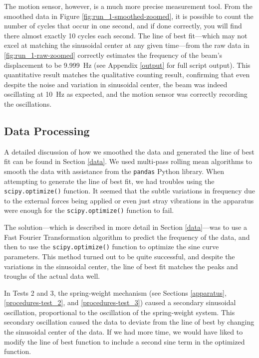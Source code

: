 \documentclass[12 pt]{report}
\begin{document}
The motion sensor, however, is a much more precise measurement tool. From the smoothed data in Figure \ref{fig:run_1-smoothed-zoomed}, it is possible to count the number of cycles that occur in one second, and if done correctly, you will find there almost exactly \num{10} cycles each second. The line of best fit---which may not excel at matching the sinusoidal center at any given time---from the raw data in \ref{fig:run_1-raw-zoomed} correctly estimates the frequency of the beam's displacement to be \qty{9.999}{\hertz} (see Appendix \ref{output} for full script output). This quantitative result matches the qualitative counting result, confirming that even despite the noise and variation in sinusoidal center, the beam was indeed oscillating at \qty{10}{\hertz} as expected, and the motion sensor was correctly recording the oscillations.

\subsection{Data Processing} \label{analysis-data_processing}
A detailed discussion of how we smoothed the data and generated the line of best fit can be found in Section \ref{data}. We used multi-pass rolling mean algorithms to smooth the data with assistance from the \texttt{pandas} Python library. When attempting to generate the line of best fit, we had troubles using the \texttt{scipy.optimize()} function. It seemed that the subtle variations in frequency due to the external forces being applied or even just stray vibrations in the apparatus were enough for the \texttt{scipy.optimize()} function to fail.

The solution---which is described in more detail in Section \ref{data}---was to use a Fast Fourier Transformation algorithm to predict the frequency of the data, and then to use the \texttt{scipy.{\allowbreak}optimize()} function to optimize the sine curve parameters. This method turned out to be quite successful, and despite the variations in the sinusoidal center, the line of best fit matches the peaks and troughs of the actual data well.

In Tests \num{2} and \num{3}, the spring-weight mechanism (see Sections \ref{apparatus}, \ref{procedures-test_2}, and \ref{procedures-test_3}) caused a secondary sinusoidal oscillation, proportional to the oscillation of the spring-weight system. This secondary oscillation caused the data to deviate from the line of best by changing the sinusoidal center of the data. If we had more time, we would have liked to modify the line of best function to include a second sine term in the optimized function.
\end{document}

